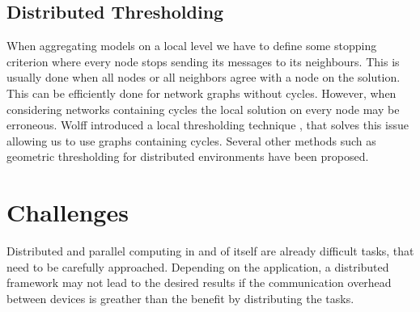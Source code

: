 
    \subsection{Distributed Thresholding} 
    When aggregating models on a local level we have to define some stopping criterion where every node stops sending its messages to its neighbours.
    This is usually done when all nodes or all neighbors agree with a node on the solution.
    This can be efficiently done for network graphs without cycles.
    However, when considering networks containing cycles the local solution on every node may be erroneous.
    Wolff introduced a local thresholding technique  \cite{wolff2013local}, that solves this issue allowing us to use graphs containing cycles.
    Several other methods such as geometric thresholding \cite{sharfman2007geometric} \cite{keren2011shape} for distributed environments have been proposed.


    

   \section{Challenges}
  Distributed and parallel computing in and of itself are already difficult tasks, that need to be carefully approached.
  Depending on the application, a distributed framework may not lead to the desired results if the communication overhead between devices is greather than the benefit by distributing the tasks.

